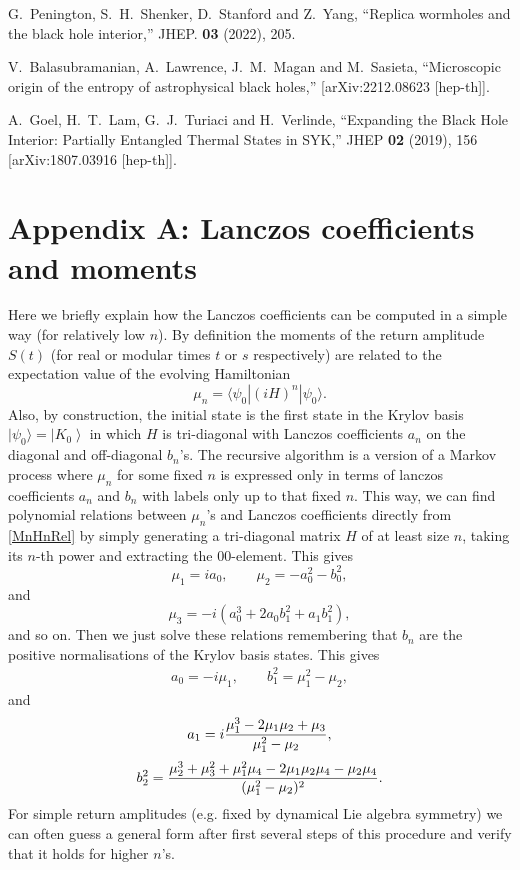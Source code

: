 \documentclass[aps,prl,twocolumn,showpacs,preprintnumbers,amsmath,amssymb]{revtex4-1}
\def\frac#1#2{{#1\over #2}}
\def\be{\begin{equation}}
\def\ee{\end{equation}}
\newcommand{\bea}{\begin{eqnarray}}
\newcommand{\eea}{\end{eqnarray}}
\newcommand{\ket}[1]{\left| #1 \right>}
\begin{document}
\begin{thebibliography}{99}
G.~Penington, S.~H.~Shenker, D.~Stanford and Z.~Yang, 
``Replica wormholes and the black hole interior,''
JHEP. \textbf{03} (2022), 205.
 
V.~Balasubramanian, A.~Lawrence, J.~M.~Magan and M.~Sasieta,
``Microscopic origin of the entropy of astrophysical black holes,''
[arXiv:2212.08623 [hep-th]].
  
A.~Goel, H.~T.~Lam, G.~J.~Turiaci and H.~Verlinde,
``Expanding the Black Hole Interior: Partially Entangled Thermal States in SYK,''
JHEP \textbf{02} (2019), 156
[arXiv:1807.03916 [hep-th]].


\end{thebibliography}


\section{Appendix A: Lanczos coefficients and moments}\label{AppendixA}
Here we briefly explain how the Lanczos coefficients can be computed in a simple way (for relatively low $n$). By definition the moments of the return amplitude $S(t)$ (for real or modular times $t$ or $s$ respectively) are related to the expectation value of the evolving Hamiltonian 
\be
\mu_n=\langle \psi_0|(iH)^n|\psi_0\rangle.\label{MnHnRel}
\ee
Also, by construction, the initial state is the first state in the Krylov basis $|\psi_0\rangle=\ket{K_0}$ in which $H$ is tri-diagonal with Lanczos coefficients $a_n$ on the diagonal and off-diagonal $b_n$'s. The recursive algorithm is a version of a Markov process where $\mu_n$ for some fixed $n$ is expressed only in terms of lanczos coefficients $a_n$ and $b_n$ with labels only up to that fixed $n$. This way, we can find polynomial relations between $\mu_n$'s and Lanczos coefficients directly from \eqref{MnHnRel} by simply generating a tri-diagonal matrix $H$ of at least size $n$, taking its $n$-th power and extracting the $00$-element. This gives
\be
\mu_1=ia_0,\qquad \mu_2=-a^2_0-b^2_0,
\ee
and
\be
\mu_3=-i(a^3_0+2a_0b^2_1+a_1b^2_1),
\ee
and so on. Then we just solve these relations remembering that $b_n$ are the positive normalisations of the Krylov basis states. This gives 
\bea
a_0=-i\mu_1,\qquad b^2_1=\mu^2_1-\mu_2,
\eea
and
\be
a_1=i\frac{\mu^3_1-2\mu_1\mu_2+\mu_3}{\mu^2_1-\mu_2},
\ee
\be
b^2_2=\frac{\mu^3_2+\mu^2_3+\mu^2_1\mu_4-2\mu_1\mu_2\mu_4-\mu_2\mu_4}{(\mu^2_1-\mu_2)^2}.
\ee
For simple return amplitudes (e.g. fixed by dynamical Lie algebra symmetry) we can often guess a general form after first several steps of this procedure and verify that it holds for higher $n$'s. 
\end{document}
